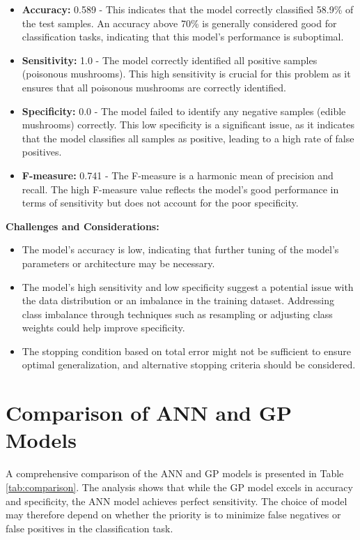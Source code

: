 \documentclass{article}
\begin{document}
\begin{itemize}
    \item \textbf{Accuracy:} 0.589 - This indicates that the model correctly classified 58.9\% of the test samples. An accuracy above 70\% is generally considered good for classification tasks, indicating that this model's performance is suboptimal.
    \item \textbf{Sensitivity:} 1.0 - The model correctly identified all positive samples (poisonous mushrooms). This high sensitivity is crucial for this problem as it ensures that all poisonous mushrooms are correctly identified.
    \item \textbf{Specificity:} 0.0 - The model failed to identify any negative samples (edible mushrooms) correctly. This low specificity is a significant issue, as it indicates that the model classifies all samples as positive, leading to a high rate of false positives.
    \item \textbf{F-measure:} 0.741 - The F-measure is a harmonic mean of precision and recall. The high F-measure value reflects the model's good performance in terms of sensitivity but does not account for the poor specificity.
\end{itemize}

\textbf{Challenges and Considerations:}
\begin{itemize}
    \item The model's accuracy is low, indicating that further tuning of the model's parameters or architecture may be necessary.
    \item The model's high sensitivity and low specificity suggest a potential issue with the data distribution or an imbalance in the training dataset. Addressing class imbalance through techniques such as resampling or adjusting class weights could help improve specificity.
    \item The stopping condition based on total error might not be sufficient to ensure optimal generalization, and alternative stopping criteria should be considered.
\end{itemize}

\section{Comparison of ANN and GP Models}
\label{sec:comparison}

A comprehensive comparison of the ANN and GP models is presented in Table \ref{tab:comparison}. The analysis shows that while the GP model excels in accuracy and specificity, the ANN model achieves perfect sensitivity. The choice of model may therefore depend on whether the priority is to minimize false negatives or false positives in the classification task.
\end{document}
